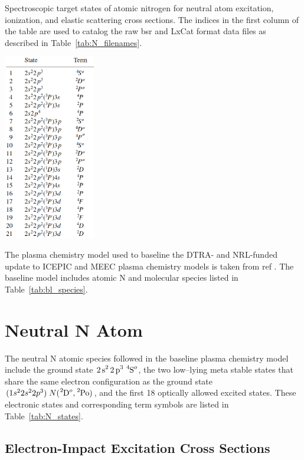 \documentclass[12pt]{article}
\begin{document}
\begin{table}
		\vspace{-50pt}
		\caption{Spectroscopic target states of atomic nitrogen for neutral atom excitation, 
		ionization, and elastic scattering cross sections. The indices in the first column of the table are used to
		catalog the raw \ac{bsr} and LxCat format data files as described in Table~\ref{tab:N_filenames}.} \label{tab:N_states}
		\centering\includegraphics[width=0.3\textwidth]{N_states.eps}
		\vspace{-50pt}
\end{table}

The plasma chemistry model used to baseline 
the DTRA- and NRL-funded update to ICEPIC and MEEC plasma 
chemistry models is taken from 
ref \cite{angus2016}. The baseline model includes atomic N and molecular  species 
listed in Table~\ref{tab:bl_species}.


\section{Neutral N Atom}

The neutral N atomic species followed in the baseline plasma chemistry model include
the ground state $\ce{2s^2 2p^3}\;\ce{^4S^o}$, the two low–lying meta stable states
that share the same electron configuration as the ground state
$(1s^22s^22p^3)\; N(\ce{^2D^o}, \ce{^2Po})$, and the first 18 optically allowed 
excited states.  These electronic states and corresponding term symbols
are listed in Table~\ref{tab:N_states}. 

\subsection{Electron-Impact Excitation Cross Sections}
\end{document}
